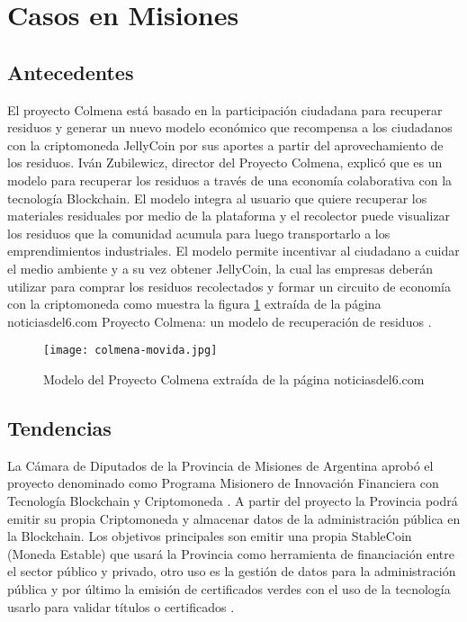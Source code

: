 \section{Casos en Misiones}
\subsection{Antecedentes}

El proyecto Colmena está basado en la participación ciudadana para recuperar residuos y generar un nuevo modelo económico 
que recompensa a los ciudadanos con la criptomoneda JellyCoin por sus aportes a partir del aprovechamiento de los residuos. 
Iván Zubilewicz, director del Proyecto Colmena, explicó que es un modelo para recuperar 
los residuos a través de una economía colaborativa con la tecnología Blockchain. El modelo
integra al usuario que quiere recuperar los materiales residuales por medio de la plataforma y el recolector 
puede visualizar los residuos que la comunidad acumula para luego transportarlo a los emprendimientos industriales.
El modelo permite incentivar al ciudadano a cuidar el medio ambiente y a su vez obtener JellyCoin, la cual las empresas
deberán utilizar para comprar los residuos recolectados y formar un circuito de economía con la criptomoneda como muestra la figura \ref{img:colmena-movida}
extraída de la página noticiasdel6.com Proyecto Colmena: un modelo de recuperación de residuos \cite[]{noticiasdel6com_proyecto_2020,jimenez_proyecto_2020}. 

\begin{figure}[H]
    \centering
    {\texttt{[image: colmena-movida.jpg]}}
    \caption{Modelo del Proyecto Colmena extraída de la página noticiasdel6.com} 
    \label{img:colmena-movida}
\end{figure}

\subsection{Tendencias}

La Cámara de Diputados de la Provincia de Misiones de Argentina aprobó el proyecto denominado como 
Programa Misionero de Innovación Financiera con Tecnología Blockchain y Criptomoneda \cite[]{camara_de_representantes_de_la_provincia_de_misiones_programa_2020}. A partir del proyecto
la Provincia podrá emitir su propia Criptomoneda y almacenar datos de la administración pública en la Blockchain.
Los objetivos principales son emitir una propia StableCoin (Moneda Estable) que usará la Provincia como herramienta de financiación entre el sector público
y privado, otro uso es la gestión de datos para la administración pública y por último la emisión de certificados verdes con el uso de la tecnología 
usarlo para validar títulos o certificados \cite[]{clementin_provincia_2021}. 
